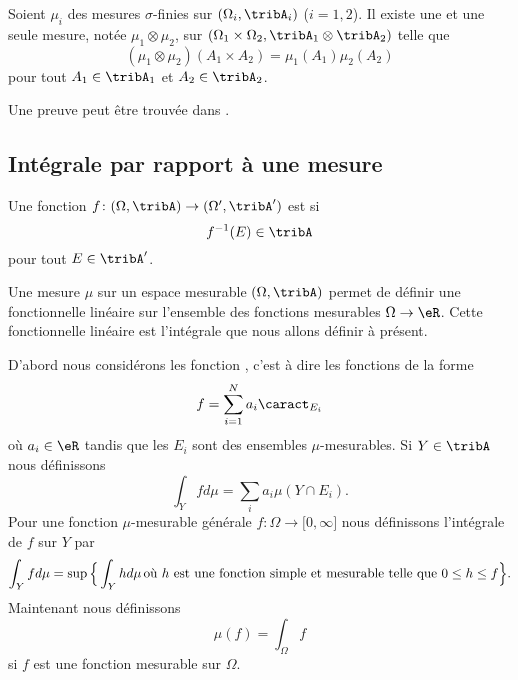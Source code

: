 \begin{theorem}
    Soient \( \mu_i\) des mesures $\sigma$-finies sur \( (\Omega_i,\tribA_i)\) (\( i=1,2\)). Il existe une et une seule mesure, notée \( \mu_1\otimes \mu_2\), sur \( (\Omega_1\times\Omega_2,\tribA_1\otimes\tribA_2)\) telle que
    \begin{equation}
        (\mu_1\otimes\mu_2)(A_1\times A_2)=\mu_1(A_1)\mu_2(A_2)
    \end{equation}
    pour tout \( A_1\in \tribA_1\) et \( A_2\in\tribA_2\).
\end{theorem}
Une preuve peut être trouvée dans \cite{FubiniBMauray,MesIntProbb}.

\subsection{Intégrale par rapport à une mesure}

Une fonction \( f\colon (\Omega,\tribA)\to (\Omega',\tribA')\) est  si 
\begin{equation}
    f^{-1}(E)\in\tribA
\end{equation}
pour tout \( E\in\tribA'\).


Une mesure \( \mu\) sur un espace mesurable \( (\Omega,\tribA)\) permet de définir une fonctionnelle linéaire sur l'ensemble des fonctions mesurables \( \Omega\to \eR\). Cette fonctionnelle linéaire est l'intégrale que nous allons définir à présent.

D'abord nous considérons les fonction , c'est à dire les fonctions de la forme
\begin{equation}
    f=\sum_{i=1}^Na_i\caract_{E_i}
\end{equation}
où \( a_i\in\eR\) tandis que les \( E_i\) sont des ensembles \( \mu\)-mesurables. Si \( Y\in \tribA\) nous définissons
\begin{equation}
    \int_Yfd\mu=\sum_ia_i\mu(Y\cap E_i).
\end{equation}
Pour une fonction \( \mu\)-mesurable générale \( f\colon \Omega\to \mathopen[ 0 , \infty \mathclose]\) nous définissons l'intégrale de \( f\) sur \( Y\) par
\begin{equation}        \label{EqDefintYfdmu}
    \int_Yfd\mu=\sup\Big\{ \int_Yhd\mu\,\text{où \( h\) est une fonction simple et mesurable telle que \( 0\leq h\leq f\)} \Big\}.
\end{equation}
Maintenant nous définissons
\begin{equation}
    \mu(f)=\int_{\Omega}f
\end{equation}
si \( f\) est une fonction mesurable sur \( \Omega\).

